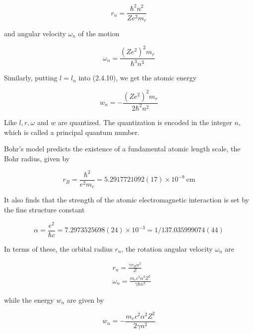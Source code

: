 \documentclass{article}
\begin{document}
\begin{equation*}
r_{n}=\frac{\hbar^{2} n^{2}}{Z e^{2} m_{r}} \tag{2.4.13}
\end{equation*}
 
and angular velocity $\omega_{n}$ of the motion
 
\begin{equation*}
\omega_{n}=\frac{\left(Z e^{2}\right)^{2} m_{r}}{\hbar^{3} n^{3}} \tag{2.4.14}
\end{equation*}
 

Similarly, putting $l=l_{n}$ into (2.4.10), we get the atomic energy
 
\begin{equation*}
w_{n}=-\frac{\left(Z e^{2}\right)^{2} m_{r}}{2 \hbar^{2} n^{2}} \tag{2.4.15}
\end{equation*}
 

Like $l, r, \omega$ and $w$ are quantized. The quantization is encoded in the integer $n$, which is called a principal quantum number.

Bohr's model predicts the existence of a fundamental atomic length scale, the Bohr radius, given by
 
\begin{equation*}
r_{B}=\frac{\hbar^{2}}{e^{2} m_{e}}=5.2917721092(17) \times 10^{-9} \mathrm{~cm} \tag{2.4.16}
\end{equation*}
 

It also finds that the strength of the atomic electromagnetic interaction is set by the fine structure constant
 
\begin{equation*}
\alpha=\frac{e^{2}}{\hbar c}=7.2973525698(24) \times 10^{-3}=1 / 137.035999074(44) \tag{2.4.17}
\end{equation*}
 

In terms of these, the orbital radius $r_{n}$, the rotation angular velocity $\omega_{n}$ are
 
\begin{align*}
& r_{n}=\frac{\gamma r_{B} n^{2}}{Z}  \tag{2.4.18}\\
& \omega_{n}=\frac{m_{e} c^{2} \alpha^{2} Z^{2}}{\gamma \hbar n^{3}} \tag{2.4.19}
\end{align*}
 
while the energy $w_{n}$ are given by
 
\begin{equation*}
w_{n}=-\frac{m_{e} c^{2} \alpha^{2} Z^{2}}{2 \gamma n^{2}} \tag{2.4.20}
\end{equation*}
 
\end{document}
